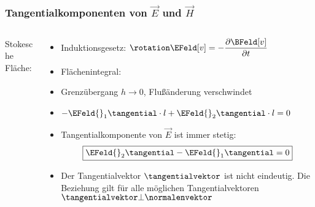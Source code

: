  \begin{frame}
  \frametitle{Tangentialkomponenten von $\vec{E}$ und $\vec{H}$}
\begin{columns}
  \begin{column}{0.4\textwidth}
    Stokesche Fläche:\\[2em]

    
	\resizebox{.7\columnwidth}{!}{}

    \end{column}
    \begin{column}{0.6\textwidth}
      \begin{itemize}
        \item<1-> Induktionsgesetz: $	\rotation \EFeld[v] = -\dfrac{\partial \BFeld[v]}{\partial t}$
          \item<2-> Flächenintegral: 
          \item<4-> Grenzübergang $h\to0$, Flußänderung verschwindet
            \item<5-> $-\EFeld{}_1\tangential \cdot l + \EFeld{}_2\tangential \cdot l = 0$
          \item<6-> \alert{Tangentialkomponente von $\vec{E}$ ist immer stetig:} 
            $$		\boxed{\EFeld{}_2\tangential - \EFeld{}_1\tangential = 0} $$
          \item<7-> Der Tangentialvektor $\tangentialvektor$ ist nicht
            eindeutig. Die Beziehung gilt für alle möglichen
            Tangentialvektoren $	\tangentialvektor \bot \normalenvektor $
        \end{itemize}
    \end{column}
\end{columns}
 \end{frame}

